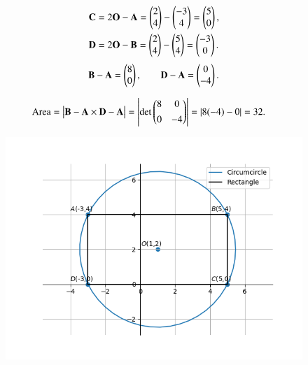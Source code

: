 \documentclass[journal]{article}
\begin{document}
\begin{align}
\mathbf{C}&=2\mathbf{O}-\mathbf{A}=\begin{pmatrix}2\\4\end{pmatrix}-\begin{pmatrix}-3\\4\end{pmatrix}=\begin{pmatrix}5\\0\end{pmatrix},\\
\mathbf{D}&=2\mathbf{O}-\mathbf{B}=\begin{pmatrix}2\\4\end{pmatrix}-\begin{pmatrix}5\\4\end{pmatrix}=\begin{pmatrix}-3\\0\end{pmatrix}.
\end{align}
\begin{align}
\mathbf{B}-\mathbf{A}=\begin{pmatrix}8\\0\end{pmatrix},\qquad
\mathbf{D}-\mathbf{A}=\begin{pmatrix}0\\-4\end{pmatrix}.
\end{align}

\begin{align}
\text{Area} &= \big|\mathbf{B}-\mathbf{A}\times\mathbf{D}-\mathbf{A}\big|
= \left|\det\begin{pmatrix}8 & 0\\[4pt]0 & -4\end{pmatrix}\right|
= |8(-4)-0| = 32.
\end{align}
\newpage
\begin{figure}
    \centering
    \includegraphics[width=1.0\linewidth]{figs/fig1.png}
    \caption{}
    \label{fig:placeholder}
\end{figure}
\end{document}
